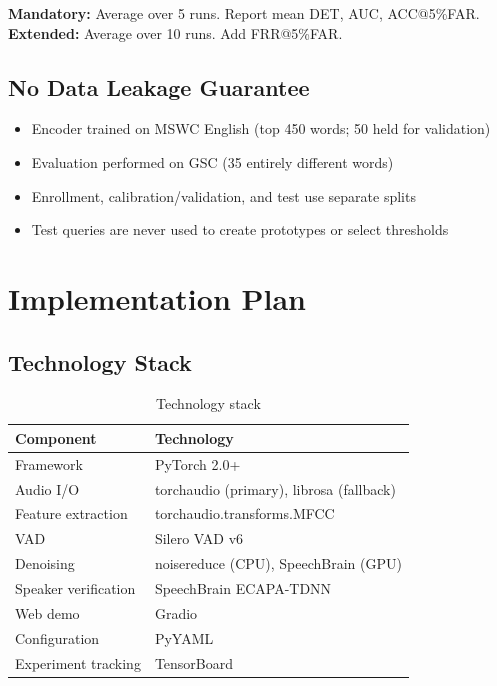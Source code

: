 \documentclass[12pt,a4paper]{report}
\begin{document}
\textbf{Mandatory:} Average over 5 runs. Report mean DET, AUC, ACC@5\%FAR. \\
\textbf{Extended:} Average over 10 runs. Add FRR@5\%FAR.

\section{No Data Leakage Guarantee}

\begin{itemize}
    \item Encoder trained on MSWC English (top 450 words; 50 held for validation)
    \item Evaluation performed on GSC (35 entirely different words)
    \item Enrollment, calibration/validation, and test use separate splits
    \item Test queries are never used to create prototypes or select thresholds
\end{itemize}


\chapter{Implementation Plan}

\section{Technology Stack}

\begin{table}[h]
\centering
\caption{Technology stack}
\label{tab:techstack}
\begin{tabular}{ll}
\toprule
\textbf{Component} & \textbf{Technology} \\
\midrule
Framework & PyTorch 2.0+ \\
Audio I/O & torchaudio (primary), librosa (fallback) \\
Feature extraction & torchaudio.transforms.MFCC \\
VAD & Silero VAD v6 \\
Denoising & noisereduce (CPU), SpeechBrain (GPU) \\
Speaker verification & SpeechBrain ECAPA-TDNN \\
Web demo & Gradio \\
Configuration & PyYAML \\
Experiment tracking & TensorBoard \\
\bottomrule
\end{tabular}
\end{table}
\end{document}
